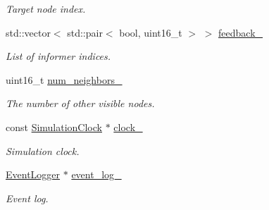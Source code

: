 \begin{DoxyCompactItemize}
\begin{DoxyCompactList}\small\item\em Target node index. \end{DoxyCompactList}\item 
\mbox{\label{classosse_1_1collaborate_1_1_node_a5389720711d92e5bd1facd9dba96b344}} 
std\+::vector$<$ std\+::pair$<$ bool, uint16\+\_\+t $>$ $>$ \hyperlink{classosse_1_1collaborate_1_1_node_a5389720711d92e5bd1facd9dba96b344}{feedback\+\_\+}
\begin{DoxyCompactList}\small\item\em List of informer indices. \end{DoxyCompactList}\item 
\mbox{\label{classosse_1_1collaborate_1_1_node_a1208a6045a92dacbd33c80dad1f40cef}} 
uint16\+\_\+t \hyperlink{classosse_1_1collaborate_1_1_node_a1208a6045a92dacbd33c80dad1f40cef}{num\+\_\+neighbors\+\_\+}
\begin{DoxyCompactList}\small\item\em The number of other visible nodes. \end{DoxyCompactList}\item 
\mbox{\label{classosse_1_1collaborate_1_1_node_ae65ffe22cbd766fbf92c416f71a0665f}} 
const \hyperlink{classosse_1_1collaborate_1_1_simulation_clock}{Simulation\+Clock} $\ast$ \hyperlink{classosse_1_1collaborate_1_1_node_ae65ffe22cbd766fbf92c416f71a0665f}{clock\+\_\+}
\begin{DoxyCompactList}\small\item\em Simulation clock. \end{DoxyCompactList}\item 
\mbox{\label{classosse_1_1collaborate_1_1_node_ae27780ec35b7ad012a6b462ed4d506f2}} 
\hyperlink{classosse_1_1collaborate_1_1_event_logger}{Event\+Logger} $\ast$ \hyperlink{classosse_1_1collaborate_1_1_node_ae27780ec35b7ad012a6b462ed4d506f2}{event\+\_\+log\+\_\+}
\begin{DoxyCompactList}\small\item\em Event log. \end{DoxyCompactList}\item 
\mbox{\label{classosse_1_1collaborate_1_1_node_a4ec904a63c911c1cbaf7dc880ad323f2}} 

\end{DoxyCompactItemize}
